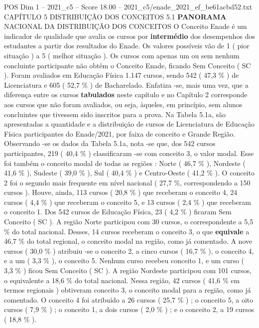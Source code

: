 \begin{textsample}{POS Dim 1 – 2021\_c5 – Score 18.00 – 2021\_c5/enade\_2021\_ef\_be61acbd52.txt}  \label{ex:f1_pos_037}
CAPÍTULO 5 DISTRIBUIÇÃO DOS CONCEITOS 5.1 \textbf{PANORAMA} NACIONAL DA DISTRIBUIÇÃO DOS CONCEITOS O Conceito Enade é um indicador de qualidade que avalia os cursos por \textbf{intermédio} dos desempenhos dos estudantes a partir dos resultados do Enade.
Os valores possíveis vão de 1 ( pior situação ) a 5 ( melhor situação ).
Os cursos com apenas um ou sem nenhum concluinte participante não obtêm o Conceito Enade, ficando Sem Conceito ( SC ).
Foram avaliados em Educação Física 1.147 cursos, sendo 542 ( 47,3 \% ) de Licenciatura e 605 ( 52,7 \% ) de Bacharelado.
Enfatiza -se, mais uma vez, que a diferença entre os cursos \textbf{tabulados} neste capítulo e no Capítulo 2 corresponde aos cursos que não foram avaliados, ou seja, àqueles, em princípio, sem alunos concluintes que tivessem sido inscritos para a prova.
Na Tabela 5.1a, são apresentadas a quantidade e a distribuição de cursos de Licenciatura de Educação Física participantes do Enade/2021, por faixa de conceito e Grande Região.
Observando -se os dados da Tabela 5.1a, nota -se que, dos 542 cursos participantes, 219 ( 40,4 \% ) classificaram -se com conceito 3, o valor modal.
Esse foi também o conceito modal de todas as regiões : Norte ( 46,7 \% ), Nordeste ( 41,6 \% ), Sudeste ( 39,0 \% ), Sul ( 40,4 \% ) e Centro-Oeste ( 41,2 \% ).
O conceito 2 foi o segundo mais frequente em nível nacional ( 27,7 \%, correspondendo a 150 cursos ).
Houve, ainda, 113 cursos ( 20,8 \% ) que receberam o conceito 4, 24 cursos ( 4,4 \% ) que receberam o conceito 5, e 13 cursos ( 2,4 \% ) que receberam o conceito 1.
Dos 542 cursos de Educação Física, 23 ( 4,2 \% ) ficaram Sem Conceito ( SC ).
A região Norte participou com 30 cursos, o correspondente a 5,5 \% do total nacional.
Desses, 14 cursos receberam o conceito 3, o que \textbf{equivale} a 46,7 \% do total regional, o conceito modal na região, como já comentado.
A nove cursos ( 30,0 \% ) atribuiu -se o conceito 2, a cinco cursos ( 16,7 \% ), o conceito 4, e a um ( 3,3 \% ), o conceito 5.
Nenhum curso recebeu conceito 1, e um curso ( 3,3 \% ) ficou Sem Conceito ( SC ).
A região Nordeste participou com 101 cursos, o equivalente a 18,6 \% do total nacional.
Nessa região, 42 cursos ( 41,6 \% em termos regionais ) obtiveram conceito 3, o conceito modal para a região, como já comentado.
O conceito 4 foi atribuído a 26 cursos ( 25,7 \% ) ; o conceito 5, a oito cursos ( 7,9 \% ) ; o conceito 1, a dois cursos ( 2,0 \% ) ; e o conceito 2, a 19 cursos ( 18,8 \% ).

\end{textsample}
